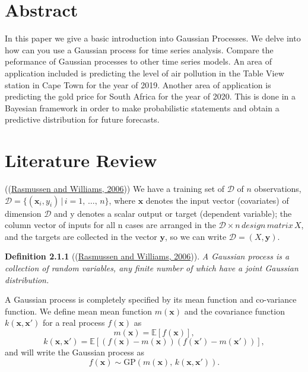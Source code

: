\documentclass[a4paper, 10pt, fleqn]{article}
\begin{document}
   \begin{flushleft}

   \section*{Abstract}

    In this paper we give a basic introduction into Gaussian Processes. We delve into how can you use a Gaussian process for time series analysis. Compare the peformance of Gaussian processes to other time series models. An area of application included is predicting the level of air pollution in the Table View station in Cape Town for the year of 2019. Another area of application is predicting the gold price for South Africa for the year of 2020. This is done in a Bayesian framework in order to make probabilistic statements and obtain a predictive distribution for future forecasts.

   \section*{Literature Review}

   ((\hyperref[Rasmussen2006]{Rasmussen and Williams, 2006})) We have a training set of $\mathcal{D}$ of $n$ observations, $\mathcal{D} = \{(\mathbf{x}_{i}, y_{i}) \, | \, i = 1, \, \ldots, \, n\}$, where $\mathbf{x}$ denotes the input vector (covariates) of dimension $\mathcal{D}$ and y denotes a scalar output or target (dependent variable); the column vector of inputs for all n cases are arranged in the $\mathcal{D} \times n \, design \, matrix\, X$, and the targets are collected in the vector $\mathbf{y}$, so we can write $\mathcal{D} = (X, \mathbf{y})$. 

   \vspace{1em}

   \textbf{Definition 2.1.1} ((\hyperref[Rasmussen2006]{Rasmussen and Williams, 2006})).
   \textit{A Gaussian process is a collection of random variables, any finite number of which have a joint Gaussian distribution.}

   \vspace{1em}

   A Gaussian process is completely specified by its mean function and co-variance function. We define mean mean function $m(\mathbf{x})$ and the covariance function $k(\mathbf{x}, \mathbf{x}')$ for a real process $f(\mathbf{x})$ as
   $$m(\mathbf{x}) = \mathbb{E}[f(\mathbf{x})],$$
   $$k(\mathbf{x}, \mathbf{x}') = \mathbb{E}[(f(\mathbf{x}) - m(\mathbf{x}))(f(\mathbf{x}') - m(\mathbf{x}'))],$$
   and will write the Gaussian process as
   $$f(\mathbf{x}) \sim \text{GP}(m(\mathbf{x}), \, k(\mathbf{x}, \mathbf{x}')).$$


\end{flushleft}
\end{document}
